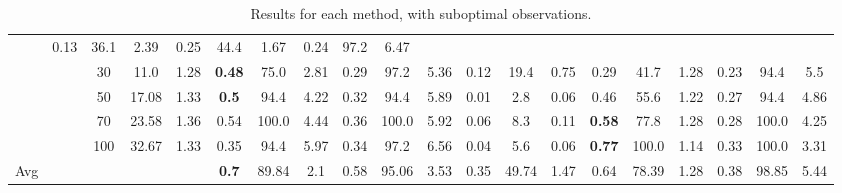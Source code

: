 \documentclass[letterpaper]{article}
\begin{document}
\begin{table*}[]
\begin{tabular}{|c|c|ccc|ccc|ccc|ccc|ccc|ccc|}
		& 0.13 & 36.1 & 2.39 	 

		& 0.25 & 44.4 & 1.67 	 

		& 0.24 & 97.2 & 6.47 	 

	\\ & & 30	 & 11.0	 & 1.28

		& \textbf{0.48} & 75.0 & 2.81 	 

		& 0.29 & 97.2 & 5.36 	 

		& 0.12 & 19.4 & 0.75 	 

		& 0.29 & 41.7 & 1.28 	 

		& 0.23 & 94.4 & 5.5 	 

	\\ & & 50	 & 17.08	 & 1.33

		& \textbf{0.5} & 94.4 & 4.22 	 

		& 0.32 & 94.4 & 5.89 	 

		& 0.01 & 2.8 & 0.06 	 

		& 0.46 & 55.6 & 1.22 	 

		& 0.27 & 94.4 & 4.86 	 

	\\ & & 70	 & 23.58	 & 1.36

		& 0.54 & 100.0 & 4.44 	 

		& 0.36 & 100.0 & 5.92 	 

		& 0.06 & 8.3 & 0.11 	 

		& \textbf{0.58} & 77.8 & 1.28 	 

		& 0.28 & 100.0 & 4.25 	 

	\\ & & 100	 & 32.67	 & 1.33

		& 0.35 & 94.4 & 5.97 	 

		& 0.34 & 97.2 & 6.56 	 

		& 0.04 & 5.6 & 0.06 	 

		& \textbf{0.77} & 100.0 & 1.14 	 

		& 0.33 & 100.0 & 3.31 	 
 \\ \hline
Avg & & & &  & \textbf{0.7} & 89.84 & 2.1 & 0.58 & 95.06 & 3.53 & 0.35 & 49.74 & 1.47 & 0.64 & 78.39 & 1.28 & 0.38 & 98.85 & 5.44
\\ \hline
\end{tabular}
\caption{Results for each method, with suboptimal observations.}
\end{table*}
\end{document}
